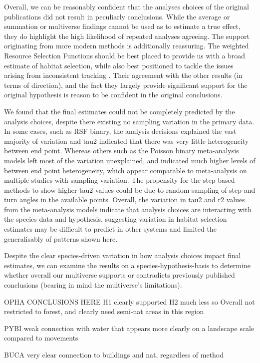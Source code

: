 \documentclass[10pt,a4paper]{article}
\begin{document}
Overall, we can be reasonably confident that the analyses choices of the original publications did not result in peculiarly conclusions.
While the average or summation or multiverse findings cannot be used as to estimate a true effect, they do highlight the high likelihood of repeated analyses agreeing.
The support originating from more modern methods is additionally reassuring.
The weighted Resource Selection Functions should be best placed to provide us with a broad estimate of habitat selection, while also best positioned to tackle the issues arising from inconsistent tracking .
Their agreement with the other results (in terms of direction), and the fact they largely provide significant support for the original hypothesis is reason to be confident in the original conclusions.

We found that the final estimates could not be completely predicted by the analysis choices, despite there existing no sampling variation in the primary data.
In some cases, such as RSF binary, the analysis decisions explained the vast majority of variation and tau2 indicated that there was very little heterogeneity between end point.
Whereas others such as the Poisson binary meta-analysis models left most of the variation unexplained, and indicated much higher levels of between end point heterogeneity, which appear comparable to meta-analysis on multiple studies with sampling variation.
The propensity for the step-based methods to show higher tau2 values could be due to random sampling of step and turn angles in the available points.
Overall, the variation in tau2 and r2 values from the meta-analysis models indicate that analysis choices are interacting with the species data and hypothesis, suggesting variation in habitat selection estimates may be difficult to predict in other systems and limited the generalisably of patterns shown here.

Despite the clear species-driven variation in how analysis choices impact final estimates, we can examine the results on a species-hypothesis-basis to determine whether overall our multiverse supports or contradicts previously published conclusions (bearing in mind the multiverse's limitations).

OPHA CONCLUSIONS HERE
H1 clearly supported
H2 much less so
Overall not restricted to forest, and clearly need semi-nat areas in this region

PYBI
weak connection with water that appears more clearly on a landscape scale compared to movements

BUCA
very clear connection to buildings and nat, regardless of method
\end{document}
